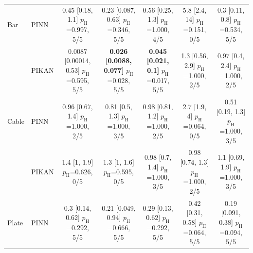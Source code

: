 \begin{tabular}{llccccc}
\addlinespace
Bar & PINN & \makecell{0.45 [0.18, 1.1]\\{\scriptsize $p_{\mathrm{H}}$=0.997, 5/5}} & \makecell{0.23 [0.087, 0.63]\\{\scriptsize $p_{\mathrm{H}}$=0.346, 5/5}} & \makecell{0.56 [0.25, 1.3]\\{\scriptsize $p_{\mathrm{H}}$=1.000, 4/5}} & \makecell{5.8 [2.4, 14]\\{\scriptsize $p_{\mathrm{H}}$=0.151, 0/5}} & \makecell{0.3 [0.11, 0.8]\\{\scriptsize $p_{\mathrm{H}}$=0.534, 5/5}}\\
 & PIKAN & \makecell{0.0087 [0.00014, 0.53]\\{\scriptsize $p_{\mathrm{H}}$=0.595, 5/5}} & \makecell{\textbf{0.026 [0.0088, 0.077]}\\{\scriptsize $p_{\mathrm{H}}$=0.028, 5/5}} & \makecell{\textbf{0.045 [0.021, 0.1]}\\{\scriptsize $p_{\mathrm{H}}$=0.017, 5/5}} & \makecell{1.3 [0.56, 2.9]\\{\scriptsize $p_{\mathrm{H}}$=1.000, 2/5}} & \makecell{0.97 [0.4, 2.4]\\{\scriptsize $p_{\mathrm{H}}$=1.000, 2/5}}\\
\addlinespace
Cable & PINN & \makecell{0.96 [0.67, 1.4]\\{\scriptsize $p_{\mathrm{H}}$=1.000, 2/5}} & \makecell{0.81 [0.5, 1.3]\\{\scriptsize $p_{\mathrm{H}}$=1.000, 3/5}} & \makecell{0.98 [0.81, 1.2]\\{\scriptsize $p_{\mathrm{H}}$=1.000, 2/5}} & \makecell{2.7 [1.9, 4]\\{\scriptsize $p_{\mathrm{H}}$=0.064, 0/5}} & \makecell{0.51 [0.19, 1.3]\\{\scriptsize $p_{\mathrm{H}}$=1.000, 3/5}}\\
 & PIKAN & \makecell{1.4 [1, 1.9]\\{\scriptsize $p_{\mathrm{H}}$=0.626, 0/5}} & \makecell{1.3 [1, 1.6]\\{\scriptsize $p_{\mathrm{H}}$=0.595, 0/5}} & \makecell{0.98 [0.7, 1.4]\\{\scriptsize $p_{\mathrm{H}}$=1.000, 3/5}} & \makecell{0.98 [0.74, 1.3]\\{\scriptsize $p_{\mathrm{H}}$=1.000, 2/5}} & \makecell{1.1 [0.69, 1.9]\\{\scriptsize $p_{\mathrm{H}}$=1.000, 3/5}}\\
\addlinespace
Plate & PINN & \makecell{0.3 [0.14, 0.62]\\{\scriptsize $p_{\mathrm{H}}$=0.292, 5/5}} & \makecell{0.21 [0.049, 0.94]\\{\scriptsize $p_{\mathrm{H}}$=0.666, 5/5}} & \makecell{0.29 [0.13, 0.62]\\{\scriptsize $p_{\mathrm{H}}$=0.292, 5/5}} & \makecell{0.42 [0.31, 0.58]\\{\scriptsize $p_{\mathrm{H}}$=0.064, 5/5}} & \makecell{0.19 [0.091, 0.38]\\{\scriptsize $p_{\mathrm{H}}$=0.094, 5/5}}\\

\end{tabular}
